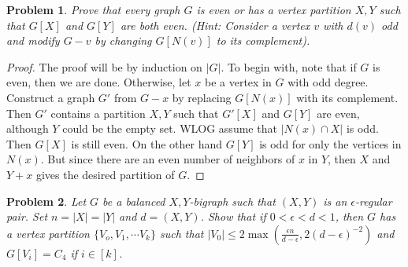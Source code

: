 \documentclass[12pt]{article}
\newtheorem{problem}{Problem}
\begin{document}
\begin{problem} Prove that every graph $G$ is even or has a vertex
  partition ${X,Y}$ such that $G[X]$ and $G[Y]$ are both even. (Hint:
  Consider a vertex $v$ with $d(v)$ odd and modify $G-v$ by changing
  $G[N(v)]$ to its complement).
\end{problem}
\begin{proof} The proof will be by induction on $|G|$. To begin with,
  note that if $G$ is even, then we are done. Otherwise, let $x$ be a
  vertex in $G$ with odd degree. Construct a graph $G'$ from $G - x$
  by replacing $G[N(x)]$ with its complement. Then $G'$ contains a
  partition $X,Y$ such that $G'[X]$ and $G[Y]$ are even, although $Y$
  could be the empty set. WLOG assume that $|N(x) \cap X|$ is
  odd. Then $G[X]$ is still even. On the other hand $G[Y]$ is odd for
  only the vertices in $N(x)$. But since there are an even number of
  neighbors of $x$ in $Y$, then $X$ and $Y+x$ gives the desired
  partition of $G$.
\end{proof}
\begin{problem} Let $G$ be a balanced $X,Y$-bigraph such that $(X,Y)$
  is an $\epsilon$-regular pair. Set $n= |X|=|Y|$ and $d=(X,Y)$. Show
  that if $0 < \epsilon < d < 1$, then $G$ has a vertex partition
  $\{V_o, V_1, \cdots V_k\}$ such that
  $|V_0| \leq 2 \max(\frac{\epsilon n}{d - \epsilon},
  2{(d-\epsilon)}^{-2})$ and $G[V_i] = C_4$ if $i \in [k]$.
\end{problem}
\end{document}
